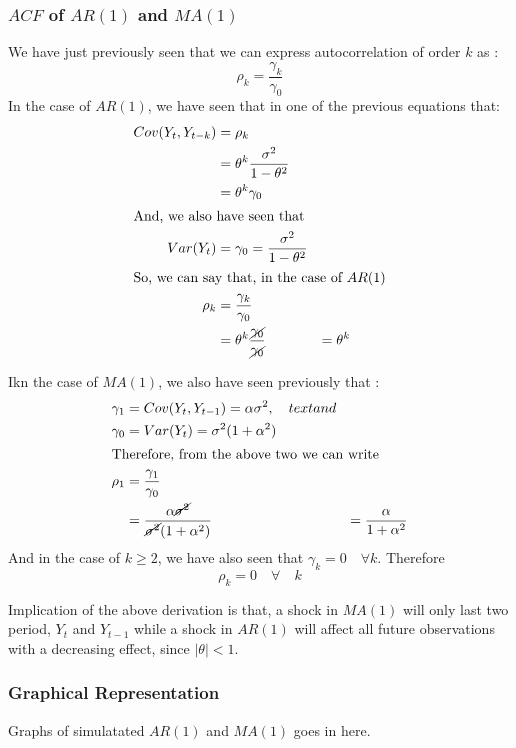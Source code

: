\documentclass{book}
\begin{document}
\subsubsection{$ACF$ of $AR(1)$ and $MA(1)$}\label{sssarma}
We have just previously seen that we can express autocorrelation of order $k$ as :
\begin{equation}
	\rho_k=\frac{\gamma_k}{\gamma_0}
	\label{}
\end{equation}
In the case of $AR(1)$, we have seen that in one of the previous equations that:
\begin{align}
	Cov(Y_t,Y_{t-k}) & =\rho_k \\
			& =\theta^k \frac{\sigma^2}{1-\theta^2} \\
			&=\theta^k \gamma_0 \\
	\intertext{And, we also have seen that}
	Var(Y_t) & =\gamma_0=\frac{\sigma^2}{1-\theta^2}\\
	\intertext{So, we can say that, in the case of $AR(1)$}
		\rho_k & =\frac{\gamma_k}{\gamma_0} \\
			&=\theta^k \frac{\cancel{\gamma_0}}{\cancel{\gamma_0}}
			&=\theta^k
	\label{}
\end{align}

Ikn the case of $MA(1)$, we also have seen previously that :
\begin{align}
	\gamma_1 & =Cov(Y_t,Y_{t-1})=\alpha \sigma^2,\quad text{and}\\
	\gamma_0 & =Var(Y_t)= \sigma^2 (1+\alpha^2) \\
	\intertext{Therefore, from the above two we can write}
	\rho_1 & =\frac{\gamma_1}{\gamma_0} \\
	&=\frac{\alpha \cancel{\sigma^2}}{\cancel{\sigma^2}(1+\alpha^2)} 
	&=\frac{\alpha}{1+\alpha^2}
	\label{}
\end{align}
And in the case of $k \ge 2 $, we have also seen that $\gamma_k=0 \quad \forall k$. Therefore
\begin{equation}
	\rho_k=0 \quad \forall \quad k
	\label{}
\end{equation}

Implication of the above derivation is that, a shock in $MA(1)$ will only last two period, $Y_t$ and $Y_{t-1}$ while  a shock in $AR(1)$ will affect all future observations with a decreasing effect, since $|\theta|<1$.
\subsubsection{Graphical Representation}
Graphs of simulatated $AR(1)$ and $MA(1)$ goes in here. 
\end{document}
